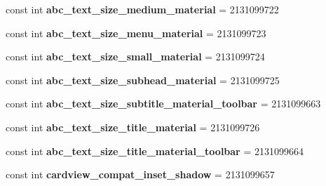 \begin{DoxyCompactItemize}
const int {\bfseries abc\+\_\+text\+\_\+size\+\_\+medium\+\_\+material} = 2131099722
\item 
\mbox{\label{class_sample_app_1_1_droid_1_1_resource_1_1_dimension_aa8bc45121f42c71e5f5fd5f42c8ef917}} 
const int {\bfseries abc\+\_\+text\+\_\+size\+\_\+menu\+\_\+material} = 2131099723
\item 
\mbox{\label{class_sample_app_1_1_droid_1_1_resource_1_1_dimension_acab6520f319e79aa9887a40dcc019f61}} 
const int {\bfseries abc\+\_\+text\+\_\+size\+\_\+small\+\_\+material} = 2131099724
\item 
\mbox{\label{class_sample_app_1_1_droid_1_1_resource_1_1_dimension_a447888ad7ba78eee49d43d4753782f4b}} 
const int {\bfseries abc\+\_\+text\+\_\+size\+\_\+subhead\+\_\+material} = 2131099725
\item 
\mbox{\label{class_sample_app_1_1_droid_1_1_resource_1_1_dimension_ac422a2c28dbece53e3dab731d0398287}} 
const int {\bfseries abc\+\_\+text\+\_\+size\+\_\+subtitle\+\_\+material\+\_\+toolbar} = 2131099663
\item 
\mbox{\label{class_sample_app_1_1_droid_1_1_resource_1_1_dimension_a1da41d450bb0bbb49015d89e421dc978}} 
const int {\bfseries abc\+\_\+text\+\_\+size\+\_\+title\+\_\+material} = 2131099726
\item 
\mbox{\label{class_sample_app_1_1_droid_1_1_resource_1_1_dimension_a1ca75000afed26ea6f6c74b030fe2f3e}} 
const int {\bfseries abc\+\_\+text\+\_\+size\+\_\+title\+\_\+material\+\_\+toolbar} = 2131099664
\item 
\mbox{\label{class_sample_app_1_1_droid_1_1_resource_1_1_dimension_a5cc40ef7d27963224084a26b899244e8}} 
const int {\bfseries cardview\+\_\+compat\+\_\+inset\+\_\+shadow} = 2131099657
\item 
\mbox{\label{class_sample_app_1_1_droid_1_1_resource_1_1_dimension_a090c87fb6042f51d26678ec030282687}} 

\end{DoxyCompactItemize}
